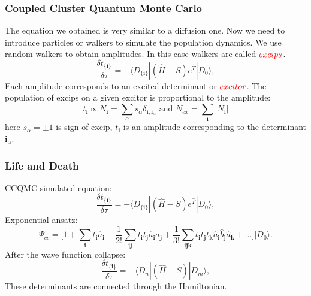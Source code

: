 \documentclass{beamer}
\begin{document}
\begin{frame}
\frametitle{Coupled Cluster Quantum Monte Carlo}
The equation we obtained is very similar to a diffusion one. Now we need to introduce particles or walkers to simulate the population dynamics. We use random walkers to obtain amplitudes. In this case walkers are called ${\color{red}excips}$. 
\begin{equation*}	
\frac{\delta t_{\{\boldsymbol{i}\}}}{\delta\tau} = -\langle D_{\{\boldsymbol{i}\}}|(\hat{H}-S)e^{\hat{T}}|D_0\rangle,
\end{equation*}
Each amplitude corresponds to an excited determinant or ${\color{red}excitor}$. The population of excips on a given excitor is proportional to the amplitude:
\begin{equation*}	
t_{\boldsymbol{i}} \propto N_{\boldsymbol{i}} = \sum_\alpha s_\alpha \delta_{{\boldsymbol{i}}, {\boldsymbol{i}}_\alpha} \text{ and }  N_{ex} = \sum_{\boldsymbol{i}} |N_{\boldsymbol{i}}|
\end{equation*}
here $s_\alpha = \pm 1$ is sign of excip, $t_{\boldsymbol{i}}$ is an amplitude corresponding to the determinant ${{\boldsymbol{i}}_\alpha}$. %
\end{frame}

\begin{frame}
\frametitle{Life and Death}
CCQMC simulated equation:
\begin{equation*}	
\frac{\delta t_{\{\boldsymbol{i}\}}}{\delta\tau} = -\langle D_{\{\boldsymbol{i}\}}|(\hat{H}-S)e^{\hat{T}}|D_0\rangle,
\end{equation*}
Exponential ansatz:
\begin{equation*}
\Psi_{cc} = \big[1 + \sum_{\boldsymbol{i}} t_{\boldsymbol{i}}\hat{a}_{\boldsymbol{i}} + \frac{1}{ 2!}\sum_{\boldsymbol{ij}} t_{\boldsymbol{i}} t_{\boldsymbol{j}} \hat{a}_{\boldsymbol{i}} \hat{a}_{\boldsymbol{j}} + \frac{1}{ 3!}\sum_{\boldsymbol{ijk}}t_{\boldsymbol{i}} t_{\boldsymbol{j}} t_{\boldsymbol{k}} \hat{a}_{\boldsymbol{i}} \hat{b}_{\boldsymbol{j}} \hat{a}_{\boldsymbol{k}} + ...  \big]|D_0\rangle.
\end{equation*}
After the wave function collapse:
\begin{equation*}	
\frac{\delta t_{\{\boldsymbol{i}\}}}{\delta\tau} = -\langle D_n|(\hat{H}-S)|D_m\rangle,
\end{equation*}
These determinants are connected through the Hamiltonian.
\end{frame}
\end{document}
